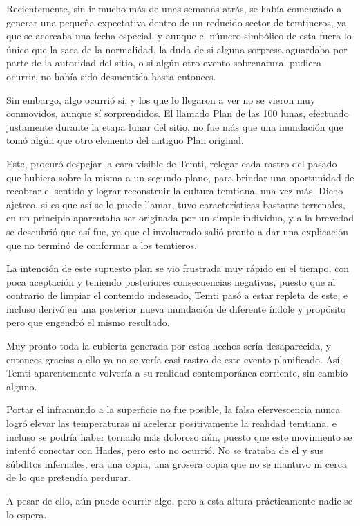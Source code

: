 \documentclass[
]{book}
\begin{document}
Recientemente, sin ir mucho más de unas semanas atrás, se había comenzado a generar una pequeña expectativa dentro de un reducido sector de temtineros, ya que se acercaba una fecha especial, y aunque el número simbólico de esta fuera lo único que la saca de la normalidad, la duda de si alguna sorpresa aguardaba por parte de la autoridad del sitio, o si algún otro evento sobrenatural pudiera ocurrir, no había sido desmentida hasta entonces.

Sin embargo, algo ocurrió si, y los que lo llegaron a ver no se vieron muy conmovidos, aunque sí sorprendidos. El llamado Plan de las 100 lunas, efectuado justamente durante la etapa lunar del sitio, no fue más que una inundación que tomó algún que otro elemento del antiguo Plan original.

Este, procuró despejar la cara visible de Temti, relegar cada rastro del pasado que hubiera sobre la misma a un segundo plano, para brindar una oportunidad de recobrar el sentido y lograr reconstruir la cultura temtiana, una vez más. Dicho ajetreo, si es que así se lo puede llamar, tuvo características bastante terrenales, en un principio aparentaba ser originada por un simple individuo, y a la brevedad se descubrió que así fue, ya que el involucrado salió pronto a dar una explicación que no terminó de conformar a los temtieros.

La intención de este supuesto plan se vio frustrada muy rápido en el tiempo, con poca aceptación y teniendo posteriores consecuencias negativas, puesto que al contrario de limpiar el contenido indeseado, Temti pasó a estar repleta de este, e incluso derivó en una posterior nueva inundación de diferente índole y propósito pero que engendró el mismo resultado.

Muy pronto toda la cubierta generada por estos hechos sería desaparecida, y entonces gracias a ello ya no se vería casi rastro de este evento planificado. Así, Temti aparentemente volvería a su realidad contemporánea corriente, sin cambio alguno.

Portar el inframundo a la superficie no fue posible, la falsa efervescencia nunca logró elevar las temperaturas ni acelerar positivamente la realidad temtiana, e incluso se podría haber tornado más doloroso aún, puesto que este movimiento se intentó conectar con Hades, pero esto no ocurrió. No se trataba de el y sus súbditos infernales, era una copia, una grosera copia que no se mantuvo ni cerca de lo que pretendía perdurar.

A pesar de ello, aún puede ocurrir algo, pero a esta altura prácticamente nadie se lo espera.
\end{document}
